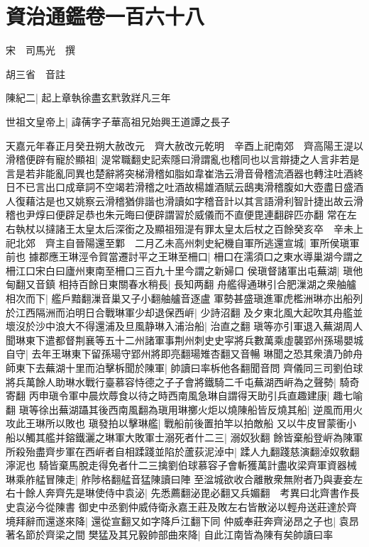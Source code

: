 \chapter{資治通鑑卷一百六十八}
宋　司馬光　撰

胡三省　音註

陳紀二|{
	起上章執徐盡玄黓敦牂凡三年}


世祖文皇帝上|{
	諱蒨字子華高祖兄始興王道譚之長子}


天嘉元年春正月癸丑朔大赦改元　齊大赦改元乾明　辛酉上祀南郊　齊高陽王湜以滑稽便辟有寵於顯祖|{
	湜常職翻史記索隱曰滑謂亂也稽同也以言辯捷之人言非若是言是若非能亂同異也楚辭將突梯滑稽如脂如韋崔浩云滑音骨稽流酒器也轉注吐酒終日不已言出口成章詞不空竭若滑稽之吐酒故楊雄酒賦云鴟夷滑稽腹如大壺盡日盛酒人復藉沽是也又姚察云滑稽猶俳諧也滑讀如字稽音計以其言語滑利智計捷出故云滑稽也尹焞曰便辟足恭也朱元晦曰便辟謂習於威儀而不直便毘連翻辟匹亦翻}
常在左右執杖以撻諸王太皇太后深銜之及顯祖殂湜有罪太皇太后杖之百餘癸亥卒　辛未上祀北郊　齊主自晉陽還至鄴　二月乙未高州刺史紀機自軍所逃還宣城|{
	軍所侯瑱軍前也}
據郡應王琳涇令賀當遷討平之王琳至柵口|{
	柵口在濡須口之東水導巢湖今謂之柵江口宋白曰廬州東南至柵口三百九十里今謂之新婦口}
侯瑱督諸軍出屯蕪湖|{
	瑱他甸翻又音鎮}
相持百餘日東關春水稍長|{
	長知两翻}
舟艦得通琳引合肥漅湖之衆舳艫相次而下|{
	艦戶黯翻漅音巢又子小翻舳艫音逐盧}
軍勢甚盛瑱進軍虎檻洲琳亦出船列於江西隔洲而泊明日合戰琳軍少却退保西㟁|{
	少詩沼翻}
及夕東北風大起吹其舟艦並壞沒於沙中浪大不得還浦及旦風静琳入浦治船|{
	治直之翻}
瑱等亦引軍退入蕪湖周人聞琳東下遣都督荆襄等五十二州諸軍事荆州刺史史寜將兵數萬乘虛襲郢州孫瑒嬰城自守|{
	去年王琳東下留孫瑒守郢州將即亮翻瑒雉杏翻又音暢}
琳聞之恐其衆潰乃帥舟師東下去蕪湖十里而泊擊柝聞於陳軍|{
	帥讀曰率柝他各翻聞音問}
齊儀同三司劉伯球將兵萬餘人助琳水戰行臺慕容恃德之子子會將鐵騎二千屯蕪湖西㟁為之聲勢|{
	騎奇寄翻}
丙申瑱令軍中晨炊蓐食以待之時西南風急琳自謂得天助引兵直趣建康|{
	趣七喻翻}
瑱等徐出蕪湖躡其後西南風翻為瑱用琳擲火炬以燒陳船皆反燒其船|{
	逆風而用火攻此王琳所以敗也}
瑱發拍以擊琳艦|{
	戰船前後置拍竿以拍敵船}
又以牛皮冒蒙衝小船以觸其艦并鎔鐵灑之琳軍大敗軍士溺死者什二三|{
	溺奴狄翻}
餘皆棄船登㟁為陳軍所殺殆盡齊步軍在西㟁者自相蹂踐並陷於蘆荻泥淖中|{
	蹂人九翻踐慈演翻淖奴敎翻濘泥也}
騎皆棄馬脫走得免者什二三擒劉伯球慕容子會斬獲萬計盡收梁齊軍資器械琳乘舴艋冒陳走|{
	舴陟格翻艋音猛陳讀曰陣}
至湓城欲收合離散衆無附者乃與妻妾左右十餘人奔齊先是琳使侍中袁泌|{
	先悉薦翻泌毘必翻又兵媚翻　考異曰北齊書作長史袁泌今從陳書}
御史中丞劉仲威侍衛永嘉王莊及敗左右皆散泌以輕舟送莊達於齊境拜辭而還遂來降|{
	還從宣翻又如字降戶江翻下同}
仲威奉莊奔齊泌昂之子也|{
	袁昂著名節於齊梁之間}
樊猛及其兄毅帥部曲來降|{
	自此江南皆為陳有矣帥讀曰率}
